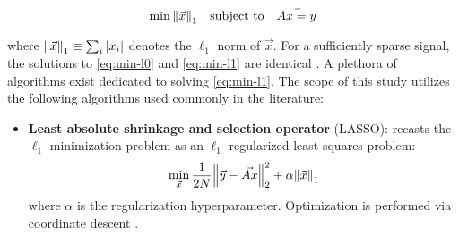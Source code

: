 \begin{equation}\label{eq:min-l1}
	\min \norm{\vec{x}}_1 \quad \textrm{subject to} \quad \vec{Ax = y}
\end{equation}

\noindent where $\norm{\vec{x}}_1 \equiv \sum_i \abs{x_i}$ denotes the $\ell_1$ norm of $\vec{x}$. For a sufficiently sparse signal, the solutions to \eqref{eq:min-l0} and \eqref{eq:min-l1} are identical \cite{Candes2006a}. A plethora of algorithms exist dedicated to solving \eqref{eq:min-l1}. The scope of this study utilizes the following algorithms used commonly in the literature:

\begin{itemize}
	\item \textbf{Least absolute shrinkage and selection operator} (LASSO): recasts the $\ell_1$ minimization problem as an $\ell_1$-regularized least squares problem:
	\begin{equation}
		\min_{\vec{x}} \frac{1}{2N} \norm{\vec{y} - \vec{Ax}}_2^2 + \alpha \norm{\vec{x}}_1
	\end{equation}
	where $\alpha$ is the regularization hyperparameter. Optimization is performed via coordinate descent \cite{scikit-learn}.
\end{itemize}